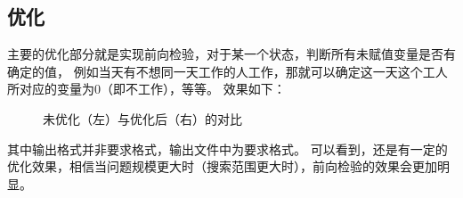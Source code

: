 \documentclass[UTF8]{article}
\begin{document}
    \subsection{优化}
    主要的优化部分就是实现前向检验，对于某一个状态，判断所有未赋值变量是否有确定的值，
    例如当天有不想同一天工作的人工作，那就可以确定这一天这个工人所对应的变量为0（即不工作），等等。
    效果如下：
    \begin{figure}[H]
        \centering
        \caption{未优化（左）与优化后（右）的对比}
    \end{figure}
    其中输出格式并非要求格式，输出文件中为要求格式。
    可以看到，还是有一定的优化效果，相信当问题规模更大时（搜索范围更大时），前向检验的效果会更加明显。
\end{document}
